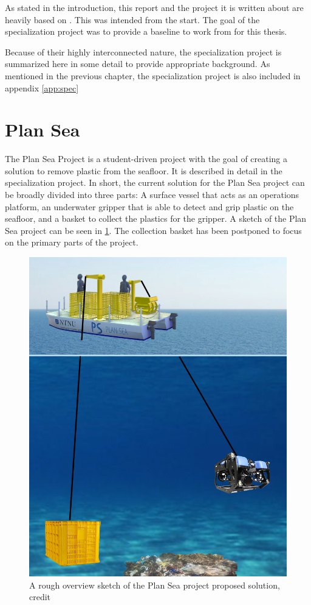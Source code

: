 \documentclass[class=article, crop=false, draft=true]{standalone}
\begin{document}
As stated in the introduction, this report and the project it is written about are heavily based on \cite{specialization}. This was intended from the start. The goal of the specialization project was to provide a baseline to work from for this thesis.

Because of their highly interconnected nature, the specialization project is summarized here in some detail to provide appropriate background. As mentioned in the previous chapter, the specialization project is also included in appendix \ref{app:spec}

\section{Plan Sea}
The Plan Sea Project is a student-driven project with the goal of creating a solution to remove plastic from the seafloor. It is described in detail in the specialization project. In short, the current solution for the Plan Sea project can be broadly divided into three parts: A surface vessel that acts as an operations platform, an underwater gripper that is able to detect and grip plastic on the seafloor, and a basket to collect the plastics for the gripper. A sketch of the Plan Sea project can be seen in \cref{fig:overview}. The collection basket has been postponed to focus on the primary parts of the project.

\begin{figure}
    \centering
    \includegraphics{overview}
    \caption{A rough overview sketch of the Plan Sea project proposed solution, credit \cite{specialization}}
    \label{fig:overview}
\end{figure}
\end{document}
